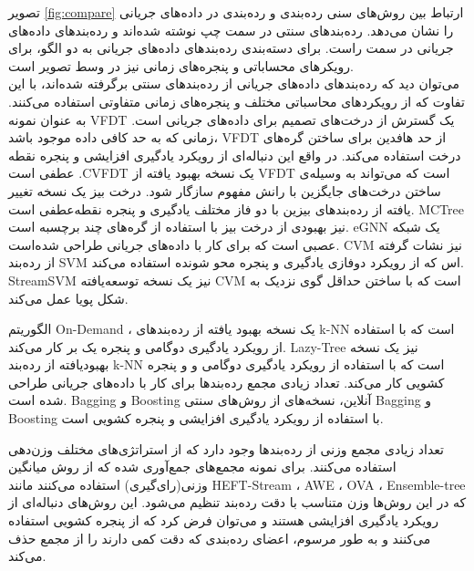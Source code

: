 تصویر
\ref{fig:compare}
ارتباط بین روش‌های سنی رده‌بندی و رده‌بندی در داده‌های جریانی را نشان می‌دهد. رده‌بندهای سنتی در سمت چپ نوشته‌ شده‌اند و رده‌بندهای داده‌های جریانی در سمت راست. برای دسته‌بندی رده‌بندهای داده‌های جریانی به دو الگو، برای رویکرهای محساباتی و پنجره‌های زمانی نیز در وسط تصویر است.
\\
می‌توان دید که رده‌بندهای داده‌های جریانی از رده‌بندهای سنتی برگرفته شده‌اند، با این تفاوت که از رویکردهای محاسباتی مختلف و پنجره‌های زمانی متفاوتی استفاده می‌کنند. به عنوان نمونه VFDT یک گسترش از درخت‌های تصمیم برای داده‌های جریانی است. زمانی که به حد کافی داده موجود باشد، VFDT از حد هافدین برای ساختن گره‌های درخت استفاده می‌کند. در واقع این دنباله‌ای از رویکرد یادگیری افزایشی و پنجره نقطه عطفی است .CVFDT یک نسخه بهبود یافته از VFDT است که می‌تواند به وسیله‌ی ساختن درخت‌های جایگزین با رانش مفهوم سازگار شود. درخت بیز یک نسخه تغییر یافته از رده‌بندهای بیزین با دو فاز مختلف یادگیری و پنجره نقطه‌عطفی است. MCTree نیز بهبودی از درخت بیز با استفاده از گره‌های چند برچسبه است. eGNN یک شبکه عصبی است که برای کار با داده‌های جریانی طراحی شده‌است. CVM نیز نشات گرفته از رده‌بند SVM اس که از رویکرد دوفازی یادگیری و پنجره محو شونده استفاده می‌کند. StreamSVM نیز یک نسخه توسعه‌یافته CVM است که با ساختن حداقل گوی نزدیک به شکل پویا عمل می‌کند.

 
الگوریتم‌ On-Demand ، یک نسخه بهبود یافته از رده‌بندهای k-NN است که با استفاده از رویکرد یادگیری دوگامی و پنجره یک بر کار می‌کند. Lazy-Tree نیز یک نسخه بهبود‌یافته از رده‌بند k-NN است که با استفاده از رویکرد یادگیری دوگامی و و پنجره کشویی کار می‌کند.
تعداد زیادی مجمع رده‌بندها برای کار با داده‌های جریانی طراحی شده است. Bagging و Boosting آنلاین، نسخه‌های از روش‌های سنتی Bagging و Boosting با استفاده از رویکرد یادگیری افزایشی و پنجره کشویی است.


تعداد زیادی مجمع وزنی از رده‌بندها وجود دارد که از استراتژی‌های مختلف وزن‌دهی استفاده می‌کنند. برای نمونه مجمع‌های جمع‌آوری شده که از روش‌ میانگین وزنی(رای‌گیری) استفاده می‌کنند مانند HEFT-Stream ، AWE ، OVA ، Ensemble-tree که در این روش‌ها وزن متناسب با دقت رده‌بند تنظیم می‌شود. این روش‌های دنباله‌ای از رویکرد یادگیری افزایشی هستند و می‌توان فرض کرد که از پنجره کشویی استفاده می‌کنند و به طور مرسوم، اعضای رده‌بندی که دقت کمی دارند را از مجمع حذف می‌کند.

